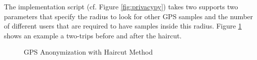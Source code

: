 The implementation script (cf. Figure \ref{fig:privacypy}) takes two
supports two parameters that specify the radius to look for other GPS
samples and the number of different users that are required to have
samples inside this radius. Figure \ref{fig:haircut} shows an example
a two-trips before and after the haircut.

\begin{figure}
  \centering
  \quad
  \caption{GPS Anonymization with Haircut Method}
  \label{fig:haircut}
\end{figure}




